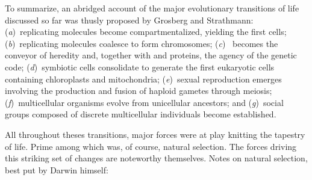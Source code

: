 \documentclass{tufte-book}
\begin{document}

\medskip

To summarize, an abridged account of the major evolutionary transitions of life
discussed so far was thusly proposed by Grosberg and
Strathmann:\cite{grosberg_evolution_2007} (\emph{a})~replicating molecules
become compartmentalized, yielding the first cells; (\emph{b})~replicating
molecules coalesce to form chromosomes; (\emph{c})~ becomes the
conveyor of heredity and, together with  and proteins, the agency
of the genetic code; (\emph{d})~symbiotic cells consolidate to generate the
first eukaryotic cells containing chloroplasts and mitochondria;
(\emph{e})~sexual reproduction emerges involving the production and fusion of
haploid gametes through meiosis; (\emph{f})~multicellular organisms evolve from
unicellular ancestors; and (\emph{g})~social groups composed of discrete
multicellular individuals become established.

All throughout theses transitions, major forces were at play knitting the
tapestry of life.  Prime among which was, of course, natural selection.  The
forces driving this striking set of changes are noteworthy themselves.  Notes on
natural selection, best put by Darwin himself:

\end{document}
